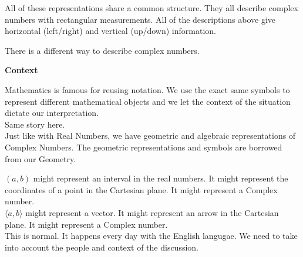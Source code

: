 \documentclass{ximera}
\begin{document}
\begin{image}
\end{image}






All of these representations share a common structure.  They all describe complex numbers with rectangular measurements.  All of the descriptions above give horizontal (left/right) and vertical (up/down) information.


There is a different way to describe complex numbers.






\begin{warning} \textbf{\textcolor{red!80!black}{Context}}


Mathematics is famous for reusing notation.  We use the exact same symbols to represent different mathematical objects and we let the context of the situation dictate our interpretation. \\

Same story here. \\

Just like with Real Numbers, we have geometric and algebraic representations of Complex Numbers.  The geometric representations and symbols are borrowed from our Geometry.


$(a, b)$ might represent an interval in the real numbers.  It might represent the coordinates of a point in the Cartesian plane.  It might represent a Complex number. \\

$\langle a, b \rangle$ might represent a vector.  It might represent an arrow in the Cartesian plane.  It might represent a Complex number. \\

This is normal. It happens every day with the English langugae.  We need to take into account the people and context of the discussion.
\end{warning}
\end{document}

